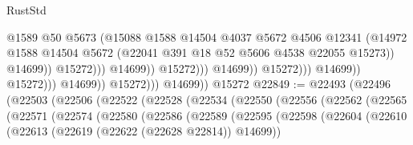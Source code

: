 \begin{lexlean}{RustStd}
\begin{coremodule}
                                                        @1589
                                                        @50
                                                        @5673
                                                        (@15088
                                                          @1588
                                                          @14504
                                                          @4037
                                                          @5672
                                                          @4506
                                                          @12341
                                                          (@14972
                                                            @1588
                                                            @14504
                                                            @5672
                                                            (@22041
                                                              @391
                                                              @18
                                                              @52
                                                              @5606
                                                              @4538
                                                              @22055
                                                              @15273))
                                                          @14699))
                                                      @15272)))
                                                @14699))
                                            @15272)))
                                      @14699))
                                  @15272)))
                            @14699))
                        @15272)))
                  @14699))
              @15272)))
        @14699))
    @15272
@22849 := @22493
    (@22496
      (@22503
        (@22506
          (@22522
            (@22528
              (@22534
                (@22550
                  (@22556
                    (@22562
                      (@22565
                        (@22571
                          (@22574
                            (@22580
                              (@22586
                                (@22589
                                  (@22595
                                    (@22598
                                      (@22604
                                        (@22610
                                          (@22613 (@22619 (@22622 (@22628 @22814)) @14699))

\end{coremodule}
\end{lexlean}

